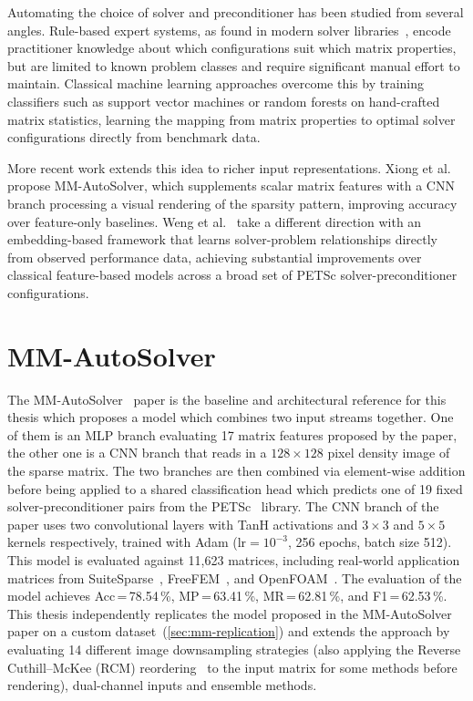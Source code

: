 Automating the choice of solver and preconditioner has been studied from several angles.
Rule-based expert systems, as found in modern solver libraries~\cite{weng2026embedding},
encode practitioner knowledge about which configurations suit
which matrix properties, but are limited to known problem classes and require significant
manual effort to maintain.
Classical machine learning approaches overcome this by training classifiers such as support
vector machines or random forests on hand-crafted matrix statistics, learning the mapping
from matrix properties to optimal solver configurations directly from benchmark data.

More recent work extends this idea to richer input representations.
Xiong et al.~\cite{xiong2025mmautosolver} propose MM-AutoSolver, which supplements scalar
matrix features with a CNN branch processing a visual rendering of the sparsity pattern,
improving accuracy over feature-only baselines.
Weng et al.~\cite{weng2026embedding} take a different direction with an embedding-based
framework that learns solver-problem relationships directly from observed performance data,
achieving substantial improvements over classical feature-based models across a broad set
of PETSc solver-preconditioner configurations.

\section{MM-AutoSolver}\label{sec:mm-autosolver}

The MM-AutoSolver~\cite{xiong2025mmautosolver} paper is the baseline and architectural reference for this thesis which proposes
a model which combines two input streams together.
One of them is an MLP branch evaluating 17 matrix features proposed by the paper, the other one
is a CNN branch that reads in a $128 \times 128$ pixel density image of the sparse matrix.
The two branches are then combined via element-wise addition before being applied to a shared classification head
which predicts one of 19 fixed solver-preconditioner pairs from the PETSc~\cite{balay2026petsc} library.
The CNN branch of the paper uses two convolutional layers with TanH activations and $3 \times 3$ and
$5 \times 5$ kernels respectively, trained with Adam ($\text{lr} = 10^{-3}$, 256 epochs, batch size 512).
This model is evaluated against 11{,}623 matrices, including real-world application matrices from SuiteSparse~\cite{davis2011university}, FreeFEM~\cite{hecht2012freefem}, and OpenFOAM~\cite{weller1998tensorial}.
The evaluation of the model achieves Acc\,=\,78.54\,\%, MP\,=\,63.41\,\%, MR\,=\,62.81\,\%, and F1\,=\,62.53\,\%.
This thesis independently replicates the model proposed in the MM-AutoSolver paper on a custom dataset~(\autoref{sec:mm-replication}) and extends
the approach by evaluating 14 different image downsampling strategies
(also applying the Reverse Cuthill--McKee (RCM) reordering~\cite{cuthill1969reducing} to the input matrix for some methods before rendering), dual-channel inputs and ensemble methods.


